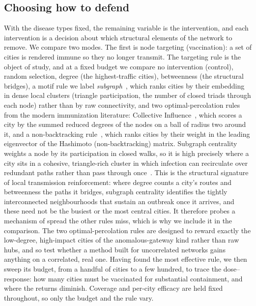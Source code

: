 \subsection{Choosing how to defend} \label{sec:defend}
With the disease types fixed, the remaining variable is the intervention, and each intervention is
a decision about which structural elements of the network to remove. We compare two modes. The
first is node targeting (vaccination): a set of cities is rendered immune so they no longer
transmit. The targeting rule is the object of study, and at a fixed budget we compare no
intervention (control), random selection, degree (the highest-traffic cities), betweenness (the
structural bridges), a motif rule we label \emph{subgraph}~\cite{estrada:subgraph,milo:motifs}, which ranks cities by
their embedding in dense local clusters (triangle participation, the number of closed triads through
each node) rather than by raw connectivity, and two optimal-percolation rules from the modern
immunization literature:
Collective Influence~\cite{morone:influence}, which scores a city by the summed reduced degrees of
the nodes on a ball of radius two around it, and a non-backtracking
rule~\cite{radicchi:nonbacktracking}, which ranks cities by their weight in the leading eigenvector
of the Hashimoto (non-backtracking) matrix. Subgraph centrality weights a node by its participation
in closed walks, so it is high precisely where a city sits in a cohesive, triangle-rich cluster in
which infection can recirculate over redundant paths rather than pass through once~\cite{estrada:subgraph}.
This is the structural signature of local transmission reinforcement: where degree counts a city's
routes and betweenness the paths it bridges, subgraph centrality identifies the tightly
interconnected neighbourhoods that sustain an outbreak once it arrives, and these need not be the
busiest or the most central cities. It therefore probes a mechanism of spread the other rules miss,
which is why we include it in the comparison. The two optimal-percolation rules are designed to
reward exactly the low-degree, high-impact cities of the anomalous-gateway kind rather than raw
hubs, and so test whether a method built for uncorrelated networks gains anything on a correlated,
real one. Having found the most effective rule, we then sweep its
budget, from a handful of cities to a few hundred, to trace the dose--response: how many cities must
be vaccinated for substantial containment, and where the returns diminish. Coverage and per-city
efficacy are held fixed throughout, so only the budget and the rule vary.

